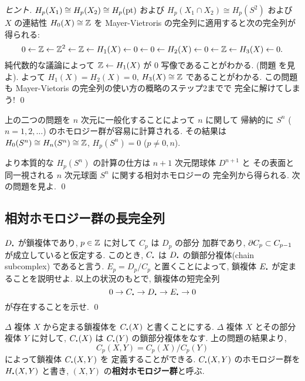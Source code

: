 \documentclass[12pt,twoside]{jarticle}
\begin{document}
\begin{proof}[ヒント]
  $H_p(X_1)\cong H_p(X_2)\cong H_p(\mathop{\mathrm{pt}})$ 
  および $H_p(X_1\cap X_2)\cong H_p(S^2)$
  および $X$ の連結性 $H_0(X)\cong {\mathbb Z}$ を
  Mayer-Vietroris の完全列に適用すると次の完全列が得られる:
  \begin{equation*}
    0
    \leftarrow {\mathbb Z}
    \leftarrow {\mathbb Z}^2
    \leftarrow {\mathbb Z}
    \leftarrow H_1(X)
    \leftarrow 0
    \leftarrow 0
    \leftarrow H_2(X)
    \leftarrow 0
    \leftarrow {\mathbb Z}
    \leftarrow H_3(X)
    \leftarrow 0.
  \end{equation*}
  純代数的な議論によって ${\mathbb Z}\leftarrow H_1(X)$ が $0$ 写像であることがわかる.
  (問題  を見よ).
  よって $H_1(X)=H_2(X)=0$, $H_3(X)\cong{\mathbb Z}$ であることがわかる.
  この問題も Mayer-Vietoris の完全列の使い方の概略のステップ2までで
  完全に解けてしまう!
  \qed
\end{proof}

\begin{guide}
  上の二つの問題を $n$ 次元に一般化することによって $n$ に関して
  帰納的に $S^n$ ($n=1,2,\ldots$) のホモロジー群が容易に計算される. 
  その結果は $H_0(S^n)\cong H_n(S^n)\cong{\mathbb Z}$, $H_p(S^n)=0$ ($p\ne0,n$).

  より本質的な $H_p(S^n)$ の計算の仕方は $n+1$ 次元閉球体 $D^{n+1}$ と
  その表面と同一視される $n$ 次元球面 $S^n$ に関する相対ホモロジーの
  完全列から得られる. 次の問題を見よ.
  \qed
\end{guide}


\subsection{相対ホモロジー群の長完全列}
\label{sec:relative-homology}

\begin{question}
  $D_\bcdot$ が鎖複体であり, $p\in{\mathbb Z}$ に対して $C_p$ は $D_p$ の部分
  加群であり, $\partial C_p \subset C_{p-1}$ が成立していると仮定する. 
  このとき, $C_\bcdot$ は $D_\bcdot$ の鎖部分複体(chain subcomplex)
  であると言う. $E_p = D_p/C_p$ と置くことによって, 鎖複体 $E_\bcdot$
  が定まることを説明せよ. 以上の状況のもとで, 鎖複体の短完全列
  \[
    0 \to
    C_\bcdot \to
    D_\bcdot \to
    E_\bcdot \to
    0
  \]
  が存在することを示せ. \qed
\end{question}

$\Delta$ 複体 $X$ から定まる鎖複体を $C_\bcdot(X)$ と書くことにする.
$\Delta$ 複体 $X$ とその部分複体 $Y$ に対して,
$C_\bcdot(X)$ は $C_\bcdot(Y)$ の鎖部分複体をなす. 
上の問題の結果より, 
\[
C_p(X,Y)=C_p(X)/C_p(Y)  
\]
によって鎖複体 $C_\bcdot(X,Y)$ を
定義することができる.
$C_\bcdot(X,Y)$ のホモロジー群を %
$H_\bcdot(X,Y)$ と書き, $(X,Y)$ の{\bf 相対ホモロジー群}と呼ぶ. 
\end{document}
